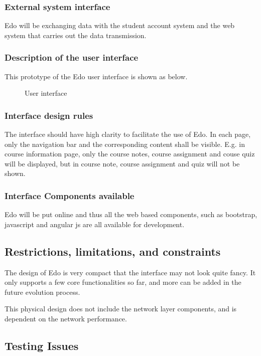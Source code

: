 \documentclass[paper=a4, fontsize=11pt]{scrartcl}
\numberwithin{equation}{section}		%
\numberwithin{figure}{section}			%
\numberwithin{table}{section}				%
\begin{document}
\subsubsection{External system interface}
Edo will be exchanging data with the student account system and the web system that carries out the data transmission. 

\subsubsection{Description of the user interface}
This prototype of the Edo user interface is shown as below.
\begin{figure}[!ht]
	\begin{center}
	\end{center}
	\caption{User interface}
\end{figure}




\subsubsection{Interface design rules}
The interface should have high clarity to facilitate the use of Edo. In each page, only the navigation bar and the corresponding content shall be visible. E.g. in course information page, only the course notes, course assignment and couse quiz will be displayed, but in course note, course assignment and quiz will not be shown.

\subsubsection{Interface Components available}
Edo will be put online and thus all the web based components, such as bootstrap, javascript and angular js are all available for development. 


\subsection{Restrictions, limitations, and constraints}
The design of Edo is very compact that the interface may not look quite fancy. It only supports a few core functionalities so far, and more can be added in the future evolution process.

This physical design does not include the network layer components, and is dependent on the network performance.
\subsection{Testing Issues}
\end{document}
